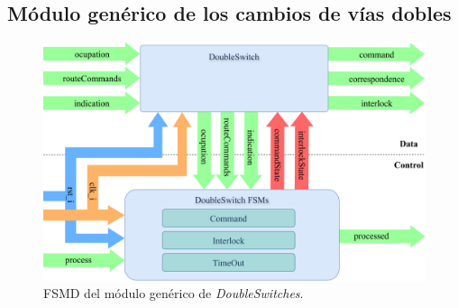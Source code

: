 \subsection{Módulo genérico de los cambios de vías dobles}

\lipsum[1]

\begin{figure}[H]
	\centering
	\includegraphics[width=1\textwidth]{Figuras/DSW_module}
	\centering\caption{FSMD del módulo genérico de \textit{DoubleSwitches}.}
	\label{fig:DSW_module}
\end{figure}

\lipsum[1]
